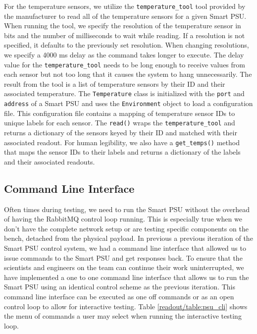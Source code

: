 For the temperature sensors, we utilize the \texttt{temperature\_tool} tool provided by the manufacturer to read all of the temperature sensors for a given Smart PSU. 
When running the tool, we specify the resolution of the temperature sensor in bits and the number of milliseconds to wait while reading.
If a resolution is not specified, it defaults to the previously set resolution.
When changing resolutions, we specify a 4000 ms delay as the command takes longer to execute. 
The delay value for the \texttt{temperature\_tool} needs to be long enough to receive values from each sensor but not too long that it causes the system to hang unnecessarily.
The result from the tool is a list of temperature sensors by their ID and their associated temperature.
The \texttt{Temperature} class is initialized with the \texttt{port} and \texttt{address} of a Smart PSU and uses the \texttt{Environment} object to load a configuration file. 
This configuration file contains a mapping of temperature sensor IDs to unique labels for each sensor.
The \texttt{read()} wraps the \texttt{temperature\_tool} and returns a dictionary of the sensors keyed by their ID and matched with their associated readout.
For human legibility, we also have a \texttt{get\_temps()} method that maps the sensor IDs to their labels and returns a dictionary of the labels and their associated readouts.

\subsection{Command Line Interface}
Often times during testing, we need to run the Smart PSU without the overhead of having the RabbitMQ control loop running.
This is especially true when we don't have the complete network setup or are testing specific components on the bench, detached from the physical payload. 
In previous a previous iteration of the Smart PSU control system, we had a command line interface that allowed us to issue commands to the Smart PSU and get responses back.
To ensure that the scientists and engineers on the team can continue their work uninterrupted, we have implemented a one to one command line interface that allows us to run the Smart PSU using an identical control scheme as the previous iteration.
This command line interface can be executed as one off commands or as an open control loop to allow for interactive testing.
Table \ref{readout/table:psu_cli} shows the menu of commands a user may select when running the interactive testing loop.

